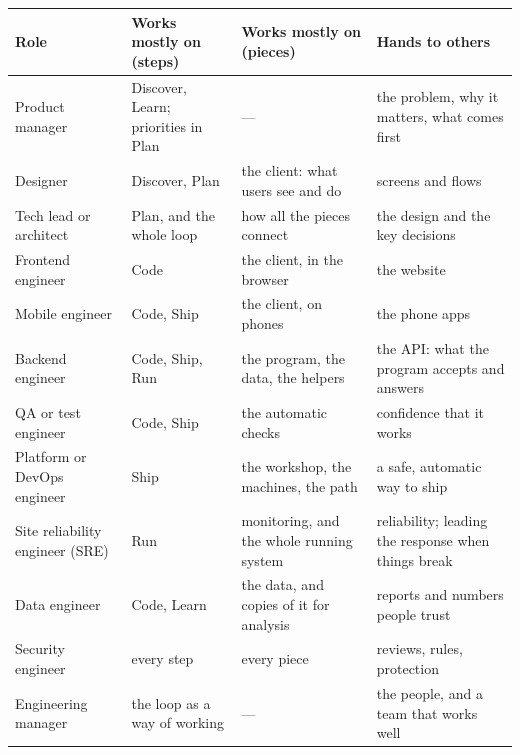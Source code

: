 {\def\LTcaptype{none} %
\begin{longtable}[]{@{}
  >{\raggedright\arraybackslash}p{}
  >{\raggedright\arraybackslash}p{}
  >{\raggedright\arraybackslash}p{}
  >{\raggedright\arraybackslash}p{}@{}}
\toprule\noalign{}
\begin{minipage}[b]{\linewidth}\raggedright
Role
\end{minipage} & \begin{minipage}[b]{\linewidth}\raggedright
Works mostly on (steps)
\end{minipage} & \begin{minipage}[b]{\linewidth}\raggedright
Works mostly on (pieces)
\end{minipage} & \begin{minipage}[b]{\linewidth}\raggedright
Hands to others
\end{minipage} \\
\midrule\noalign{}
\endhead
\bottomrule\noalign{}
\endlastfoot
Product manager & Discover, Learn; priorities in Plan & --- & the problem, why it matters, what comes first \\
Designer & Discover, Plan & the client: what users see and do & screens and flows \\
Tech lead or architect & Plan, and the whole loop & how all the pieces connect & the design and the key decisions \\
Frontend engineer & Code & the client, in the browser & the website \\
Mobile engineer & Code, Ship & the client, on phones & the phone apps \\
Backend engineer & Code, Ship, Run & the program, the data, the helpers & the API: what the program accepts and answers \\
QA or test engineer & Code, Ship & the automatic checks & confidence that it works \\
Platform or DevOps engineer & Ship & the workshop, the machines, the path & a safe, automatic way to ship \\
Site reliability engineer (SRE) & Run & monitoring, and the whole running system & reliability; leading the response when things break \\
Data engineer & Code, Learn & the data, and copies of it for analysis & reports and numbers people trust \\
Security engineer & every step & every piece & reviews, rules, protection \\
Engineering manager & the loop as a way of working & --- & the people, and a team that works well \\
\end{longtable}
}

